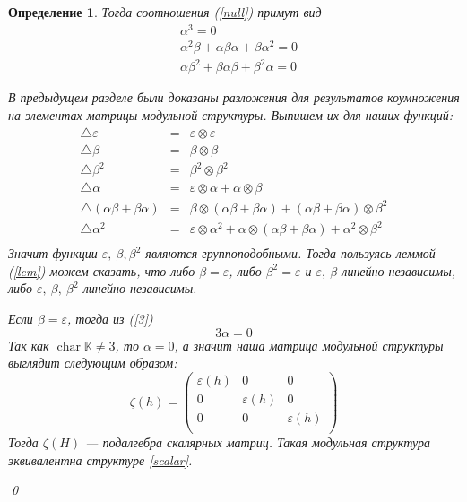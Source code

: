 \documentclass[12pt, reqno, a4paper, oneside, notitlepage]{amsart}
\makeatletter
\theoremstyle{mytheoremstyle}
\theoremstyle{myremarkstyle}
\newtheorem{definition}[theorem]{Определение}
\numberwithin{equation}{section}
\renewenvironment{proof}[1][\proofname]{\par\indent {\bfseries #1\@addpunct{.} }}{\qed}
\DeclareMathOperator{\chr}{char}
\makeatother
\begin{document}
\begin{definition}
\begin{proof}
  Тогда соотношения (\ref{null}) примут вид
    \begin{align}
        &\alpha^3 = 0 \label{1}\\
        &\alpha^2\beta+\alpha\beta\alpha + \beta\alpha^2 = 0 \label{2}\\
        &\alpha\beta^2+\beta\alpha\beta+\beta^2\alpha = 0 \label{3}
    \end{align}
    
    В предыдущем разделе были доказаны разложения для результатов коумножения на элементах матрицы модульной структуры. Выпишем их для наших функций:
    \begin{eqnarray*}
        \bigtriangleup\varepsilon &=& \varepsilon \otimes \varepsilon\\
		\bigtriangleup\beta &=& \beta \otimes \beta\\
		\bigtriangleup\beta^2 &=& \beta^2 \otimes \beta^2\\
        \bigtriangleup\alpha &=& \varepsilon \otimes \alpha + \alpha \otimes \beta\\
        \bigtriangleup(\alpha\beta+\beta\alpha) &=& \beta \otimes (\alpha\beta+\beta\alpha) + (\alpha\beta+\beta\alpha)\otimes \beta^2\\
        \bigtriangleup\alpha^2 &=& \varepsilon \otimes \alpha^2 + \alpha \otimes (\alpha\beta+\beta\alpha) + \alpha^2 \otimes \beta^2\\
    \end{eqnarray*}
	Значит функции $\varepsilon,\ \beta, \beta^2$ являются группоподобными. Тогда пользуясь леммой (\ref{lem}) можем сказать, что либо $\beta = \varepsilon$, 
	либо $\beta^2 = \varepsilon$ и $\varepsilon,\ \beta$ линейно независимы, либо $\varepsilon,\ \beta,\ \beta^2$ линейно независимы.

	Если $\beta = \varepsilon$, тогда из (\ref{3}) 
	\[
	  3\alpha = 0
	\]
	Так как $\chr \mathbb{K} \neq 3$, то $\alpha = 0$, а значит наша матрица модульной структуры выглядит следующим образом:\[
    \zeta(h) = \begin{pmatrix}
        \varepsilon(h) & 0 & 0\\
        0 & \varepsilon(h) & 0\\
        0 & 0 & \varepsilon(h)\\
    \end{pmatrix}
    \]
    Тогда $\zeta(H)$ --- подалгебра скалярных матриц. Такая модульная структура эквивалентна структуре \ref{scalar}.


\end{proof}
\end{definition}
\end{document}
